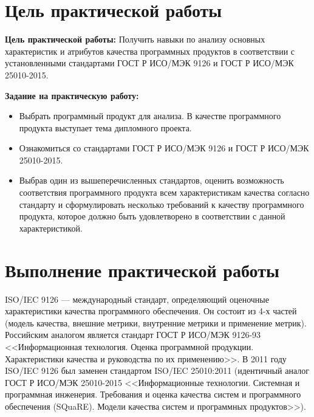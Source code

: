\section*{\LARGE Цель практической работы}

\textbf{Цель практической работы:}
Получить навыки по анализу основных характеристик и атрибутов
качества программных продуктов в соответствии с установленными
стандартами ГОСТ Р ИСО/МЭК 9126 и ГОСТ Р ИСО/МЭК 25010-2015.

\textbf{Задание на практическую работу:}

\begin{itemize}
	\item Выбрать программный продукт для анализа. В качестве программного
		продукта выступает тема дипломного проекта.
	\item Ознакомиться со стандартами
		ГОСТ Р ИСО/МЭК 9126 и ГОСТ Р ИСО/МЭК 25010-2015.
	\item Выбрав один из вышеперечисленных стандартов, оценить
		возможность соответствия программного продукта всем характеристикам
		качества согласно стандарту и сформулировать несколько требований к
		качеству программного продукта, которое должно быть удовлетворено в
		соответствии с данной характеристикой.
\end{itemize}

\clearpage

\section*{\LARGE Выполнение практической работы}

ISO/IEC 9126 --- международный стандарт, определяющий оценочные
характеристики качества программного обеспечения. Он состоит из 4-х частей
(модель качества, внешние метрики, внутренние метрики и применение
метрик). Российским аналогом является стандарт ГОСТ Р ИСО/МЭК 9126-93
<<Информационная технология. Оценка программной продукции.
Характеристики качества и руководства по их применению>>.
В 2011 году ISO/IEC 9126 был заменен стандартом ISO/IEC 25010:2011
(идентичный аналог ГОСТ Р ИСО/МЭК 25010-2015 <<Информационные
технологии. Системная и программная инженерия. Требования и оценка
качества систем и программного обеспечения (SQuaRE). Модели качества
систем и программных продуктов>>).

